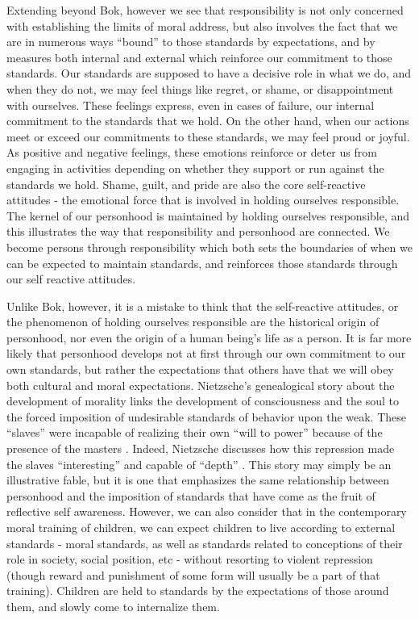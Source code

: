 \documentclass[phd,12pt,oneside,paper=letterpaper]{ubcthesis}
\begin{document}
Extending beyond Bok, however we see that responsibility is not only concerned with establishing the limits of moral address, but also involves the fact that we are in numerous ways ``bound'' to those standards by expectations, and by measures both internal and external which reinforce our commitment to those standards. Our standards are supposed to have a decisive role in what we do, and when they do not, we may feel things like regret, or shame, or disappointment with ourselves. These feelings express, even in cases of failure, our internal commitment to the standards that we hold. On the other hand, when our actions meet or exceed our commitments to these standards, we may feel proud or joyful. As positive and negative feelings, these emotions reinforce or deter us from engaging in activities depending on whether they support or run against the standards we hold. Shame, guilt, and pride are also the core self-reactive attitudes - the emotional force that is involved in holding ourselves responsible. The kernel of our personhood is maintained by holding ourselves responsible, and this illustrates the way that responsibility and personhood are connected. We become persons through responsibility which both sets the boundaries of when we can be expected to maintain standards, and reinforces those standards through our self reactive attitudes. 

Unlike Bok, however, it is a mistake to think that the self-reactive attitudes, or the phenomenon of holding ourselves responsible are the historical origin of personhood, nor even the origin of a human being's life as a person. It is far more likely that personhood develops not at first through our own commitment to our own standards, but rather the expectations that others have that we will obey both cultural and moral expectations. Nietzsche's genealogical story about the development of morality links the development of consciousness and the soul to the forced imposition of undesirable standards of behavior upon the weak. These ``slaves'' were incapable of realizing their own ``will to power'' because of the presence of the masters \citep[p.16-7]{nietzsche2010}. Indeed, Nietzsche discusses how this repression made the slaves ``interesting'' and capable of ``depth'' \citep[p.57]{nietzsche2010}. This story may simply be an illustrative fable, but it is one that emphasizes the same relationship between personhood and the imposition of standards that have come as the fruit of reflective self awareness. However, we can also consider that in the contemporary moral training of children, we can expect children to live according to external standards - moral standards, as well as standards related to conceptions of their role in society, social position, etc - without resorting to violent repression (though reward and punishment of some form will usually be a part of that training). Children are held to standards by the expectations of those around them, and slowly come to internalize them.
\end{document}
